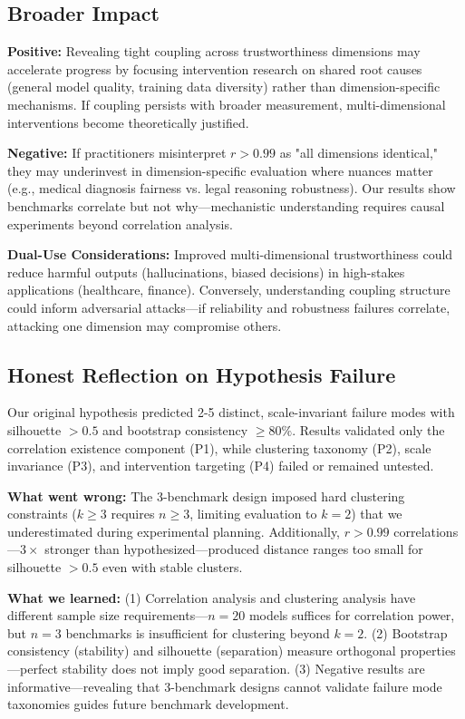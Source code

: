 \subsection{Broader Impact}

\textbf{Positive:} Revealing tight coupling across trustworthiness dimensions may accelerate progress by focusing intervention research on shared root causes (general model quality, training data diversity) rather than dimension-specific mechanisms. If coupling persists with broader measurement, multi-dimensional interventions become theoretically justified.

\textbf{Negative:} If practitioners misinterpret $r > 0.99$ as "all dimensions identical," they may underinvest in dimension-specific evaluation where nuances matter (e.g., medical diagnosis fairness vs. legal reasoning robustness). Our results show benchmarks correlate but not why---mechanistic understanding requires causal experiments beyond correlation analysis.

\textbf{Dual-Use Considerations:} Improved multi-dimensional trustworthiness could reduce harmful outputs (hallucinations, biased decisions) in high-stakes applications (healthcare, finance). Conversely, understanding coupling structure could inform adversarial attacks---if reliability and robustness failures correlate, attacking one dimension may compromise others.

\subsection{Honest Reflection on Hypothesis Failure}

Our original hypothesis predicted 2-5 distinct, scale-invariant failure modes with silhouette $> 0.5$ and bootstrap consistency $\geq 80\%$. Results validated only the correlation existence component (P1), while clustering taxonomy (P2), scale invariance (P3), and intervention targeting (P4) failed or remained untested.

\textbf{What went wrong:} The 3-benchmark design imposed hard clustering constraints ($k \geq 3$ requires $n \geq 3$, limiting evaluation to $k=2$) that we underestimated during experimental planning. Additionally, $r > 0.99$ correlations---$3 \times$ stronger than hypothesized---produced distance ranges too small for silhouette $> 0.5$ even with stable clusters.

\textbf{What we learned:} (1) Correlation analysis and clustering analysis have different sample size requirements---$n=20$ models suffices for correlation power, but $n=3$ benchmarks is insufficient for clustering beyond $k=2$. (2) Bootstrap consistency (stability) and silhouette (separation) measure orthogonal properties---perfect stability does not imply good separation. (3) Negative results are informative---revealing that 3-benchmark designs cannot validate failure mode taxonomies guides future benchmark development.

